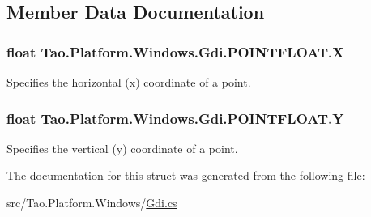 \subsection{Member Data Documentation}
\hypertarget{struct_tao_1_1_platform_1_1_windows_1_1_gdi_1_1_p_o_i_n_t_f_l_o_a_t_ada8984b7759fcda00b76f906ef02665f}{
\subsubsection[{X}]{\setlength{\rightskip}{0pt plus 5cm}float {\bf Tao.Platform.Windows.Gdi.POINTFLOAT.X}}}
\label{struct_tao_1_1_platform_1_1_windows_1_1_gdi_1_1_p_o_i_n_t_f_l_o_a_t_ada8984b7759fcda00b76f906ef02665f}


Specifies the horizontal (x) coordinate of a point. 

\hypertarget{struct_tao_1_1_platform_1_1_windows_1_1_gdi_1_1_p_o_i_n_t_f_l_o_a_t_afe74255efac2b639ae9c3b1b135cbabc}{
\subsubsection[{Y}]{\setlength{\rightskip}{0pt plus 5cm}float {\bf Tao.Platform.Windows.Gdi.POINTFLOAT.Y}}}
\label{struct_tao_1_1_platform_1_1_windows_1_1_gdi_1_1_p_o_i_n_t_f_l_o_a_t_afe74255efac2b639ae9c3b1b135cbabc}


Specifies the vertical (y) coordinate of a point. 



The documentation for this struct was generated from the following file:\begin{DoxyCompactItemize}
\item 
src/Tao.Platform.Windows/\hyperlink{_gdi_8cs}{Gdi.cs}\end{DoxyCompactItemize}
